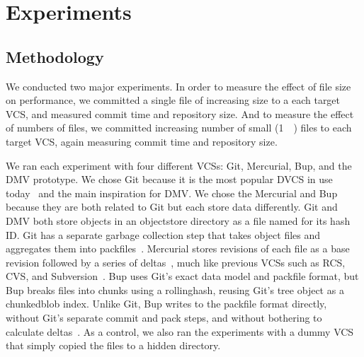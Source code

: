 \section{Experiments}

\subsection{Methodology}

We conducted two major experiments.
In order to measure the effect of file size on performance, we committed a single file of increasing size to a each target \gls{VCS}, and measured commit time and repository size.
And to measure the effect of numbers of files, we committed increasing number of small (\SI{1}{\kibi\byte}) files to each target \gls{VCS}, again measuring commit time and repository size.

We ran each experiment with four different \glspl{VCS}: Git, Mercurial, Bup, and the DMV prototype.
We chose Git because it is the most popular \gls{DVCS} in use today~\cite{what_are_devs_talking_about} and the main inspiration for DMV.
We chose the Mercurial and Bup because they are both related to Git but each store data differently.
Git and DMV both store objects in an \gls{objectstore} directory as a file named for its hash ID.
Git has a separate garbage collection step that takes object files and aggregates them into \glspl{packfile}~\cite[Section 10.7]{git_book}.
Mercurial stores revisions of each file as a base revision followed by a series of deltas~\cite[Chapter 4]{hgbook}, much like previous \glspl{VCS} such as RCS, CVS, and Subversion~\cite{history_of_version_control}.
Bup uses Git's exact data model and \gls{packfile} format, but Bup breaks files into chunks using a \gls{rollinghash}, reusing Git's \gls{tree} object as a \gls{chunkedblob} index\footnotemark.
Unlike Git, Bup writes to the \gls{packfile} format directly, without Git's separate commit and pack steps, and without bothering to calculate deltas~\cite{bup_design}.
As a control, we also ran the experiments with a dummy \gls{VCS} that simply copied the files to a hidden directory.


